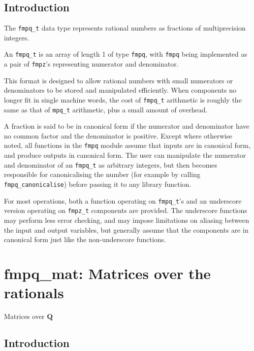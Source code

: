 \documentclass[a4paper,10pt]{book}
\newcommand{\Q}{\mathbf{Q}}%
\newcommand{\code}{\lstinline}
\begin{document}
{{\section{Introduction}

The \code{fmpq_t} data type represents rational numbers
as fractions of multiprecision integers.

An \code{fmpq_t} is an array of length 1 of type \code{fmpq},
with \code{fmpq} being implemented as a pair of \code{fmpz}'s
representing numerator and denominator.

This format is designed to allow rational numbers with small
numerators or denominators to be stored and manipulated
efficiently. When components no longer fit in single
machine words, the cost of \code{fmpq_t} arithmetic
is roughly the same as that of \code{mpq_t} arithmetic,
plus a small amount of overhead.

A fraction is said to be in canonical form if the numerator
and denominator have no common factor and the denominator is
positive. Except where otherwise noted, all functions in the
\code{fmpq} module assume that
inputs are in canonical form, and produce outputs in canonical form.
The user can manipulate the numerator and denominator of an
\code{fmpq_t} as arbitrary integers, but then becomes
responsible for canonicalising the number (for example by calling
\code{fmpq_canonicalise}) before passing it to any library function.

For most operations, both a function operating
on \code{fmpq_t}'s and an underscore version operating
on \code{fmpz_t} components are provided. The underscore
functions may perform less error checking,
and may impose limitations on aliasing between the
input and output variables, but
generally assume that the components are in
canonical form just like the non-underscore functions.




\chapter{fmpq\_mat: Matrices over the rationals}
\epigraph{Matrices over $\Q$}{}

\section{Introduction}

}}
\end{document}
